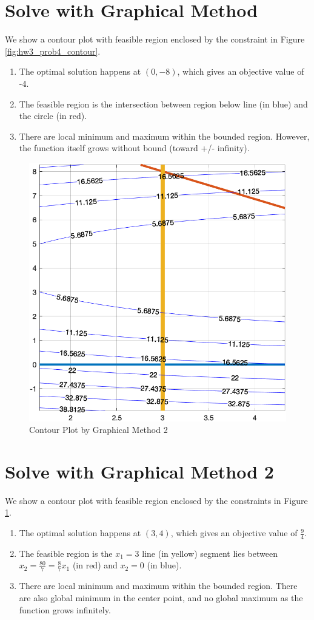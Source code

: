 \section{Solve with Graphical Method}
We show a contour plot with feasible region enclosed by the constraint in Figure \ref{fig:hw3_prob4_contour}.
\begin{enumerate}
\item The optimal solution happens at $(0, -8)$, which gives an objective value of -4.
\item The feasible region is the intersection between region below line (in blue) and the circle (in red). 
\item There are local minimum and maximum within the bounded region. However, the function itself grows without bound (toward +/- infinity). 



\end{enumerate}

\begin{figure}
    \centering
    \includegraphics[width=0.5\linewidth]{hw3/prob5_plot.png}
    \caption{Contour Plot by Graphical Method 2}
    \label{fig:hw3_prob5_contour}
\end{figure}
\section{Solve with Graphical Method 2}

We show a contour plot with feasible region enclosed by the constraints in Figure \ref{fig:hw3_prob5_contour}.

\begin{enumerate}
\item The optimal solution happens at $(3, 4)$, which gives an objective value of $\frac{9}{4}$.
\item The feasible region is the $x_1=3$ line (in yellow) segment lies between $x_2=\frac{80}{7} = \frac{8}{7}x_1$ (in red) and $x_2=0$ (in blue).
\item There are local minimum and maximum within the bounded region. There are also global minimum in the center point, and no global maximum as the function grows infinitely.
\end{enumerate}

